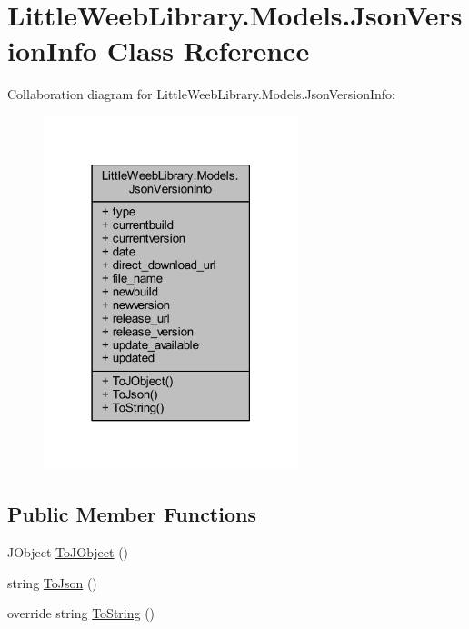 \hypertarget{class_little_weeb_library_1_1_models_1_1_json_version_info}{}\section{Little\+Weeb\+Library.\+Models.\+Json\+Version\+Info Class Reference}
\label{class_little_weeb_library_1_1_models_1_1_json_version_info}


Collaboration diagram for Little\+Weeb\+Library.\+Models.\+Json\+Version\+Info\+:\nopagebreak
\begin{figure}[H]
\begin{center}
\leavevmode
\includegraphics[width=210pt]{class_little_weeb_library_1_1_models_1_1_json_version_info__coll__graph}
\end{center}
\end{figure}
\subsection*{Public Member Functions}
\begin{DoxyCompactItemize}
\item 
J\+Object \mbox{\hyperlink{class_little_weeb_library_1_1_models_1_1_json_version_info_a08c6024e38bd3141ef69612e877c4406}{To\+J\+Object}} ()
\item 
string \mbox{\hyperlink{class_little_weeb_library_1_1_models_1_1_json_version_info_a79b72a4b31accba79e2fbf1ca93297c4}{To\+Json}} ()
\item 
override string \mbox{\hyperlink{class_little_weeb_library_1_1_models_1_1_json_version_info_a72efae30c86f1e6baaef42065127bdd2}{To\+String}} ()
\end{DoxyCompactItemize}
